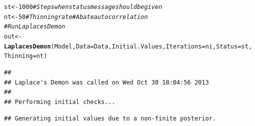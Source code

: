 \documentclass{article}\usepackage[]{graphicx}\usepackage[]{color}
\makeatletter
\newcommand{\hlnum}[1]{\textcolor[rgb]{0.686,0.059,0.569}{#1}}%
\newcommand{\hlcom}[1]{\textcolor[rgb]{0.678,0.584,0.686}{\textit{#1}}}%
\newcommand{\hlstd}[1]{\textcolor[rgb]{0.345,0.345,0.345}{#1}}%
\newcommand{\hlkwb}[1]{\textcolor[rgb]{0.69,0.353,0.396}{#1}}%
\newcommand{\hlkwc}[1]{\textcolor[rgb]{0.333,0.667,0.333}{#1}}%
\newcommand{\hlkwd}[1]{\textcolor[rgb]{0.737,0.353,0.396}{\textbf{#1}}}%
\newenvironment{kframe}{%
 \def\at@end@of@kframe{}%
 \ifinner\ifhmode%
  \def\at@end@of@kframe{\end{minipage}}%
  \begin{minipage}{\columnwidth}%
 \fi\fi%
 \def\FrameCommand##1{\hskip\@totalleftmargin \hskip-\fboxsep
 \colorbox{shadecolor}{##1}\hskip-\fboxsep
     \hskip-\linewidth \hskip-\@totalleftmargin \hskip\columnwidth}%
 \MakeFramed {\advance\hsize-\width
   \@totalleftmargin\z@ \linewidth\hsize
   \@setminipage}}%
 {\par\unskip\endMakeFramed%
 \at@end@of@kframe}
\newenvironment{knitrout}{}{} %
\makeatother
\begin{document}
\begin{knitrout}
\begin{kframe}
\begin{alltt}
\hlstd{st} \hlkwb{<-} \hlnum{1000}  \hlcom{# Steps when status message should be given}
\hlstd{nt} \hlkwb{<-} \hlnum{50}  \hlcom{# Thinning rate #  Abate autocorrelation}
\hlcom{# Run LaplacesDemon}
\hlstd{out} \hlkwb{<-} \hlkwd{LaplacesDemon}\hlstd{(Model,} \hlkwc{Data} \hlstd{= Data, Initial.Values,} \hlkwc{Iterations} \hlstd{= ni,} \hlkwc{Status} \hlstd{= st,}
    \hlkwc{Thinning} \hlstd{= nt)}
\end{alltt}
\begin{verbatim}
## 
## Laplace's Demon was called on Wed Oct 30 18:04:56 2013
## 
## Performing initial checks...
\end{verbatim}


{\ttfamily\noindent\color{warningcolor}{\#\# Warning: NaNs produced\\\#\# Warning: NAs produced}}\begin{verbatim}
## Generating initial values due to a non-finite posterior.
\end{verbatim}



\end{kframe}
\end{knitrout}
\end{document}

